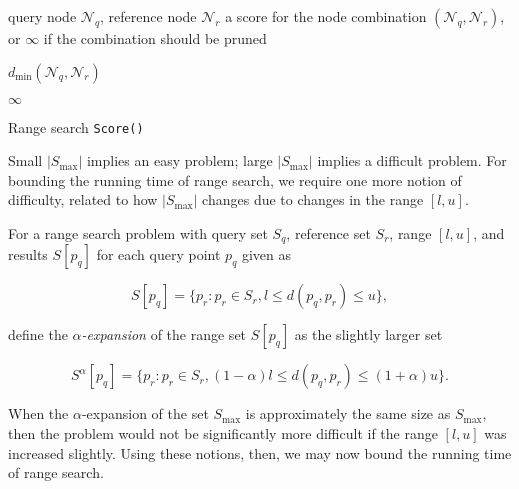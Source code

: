 \begin{algorithm}[tb]
  \begin{algorithmic}[1]
     query node $\mathscr{N}_q$, reference node
$\mathscr{N}_r$
     a score for the node combination $(\mathscr{N}_q,
\mathscr{N}_r)$, or $\infty$ if the combination should be pruned

    \medskip

      \RETURN $d_{\min}(\mathscr{N}_q, \mathscr{N}_r)$
    \ENDIF

    \RETURN $\infty$
  \end{algorithmic}
  \caption{Range search \texttt{Score()}}
  \label{alg:rs_sc}
\end{algorithm}

Small $| S_{\max} |$ implies an easy problem; large $| S_{\max} |$ implies a
difficult problem.  For bounding the running time of range search, we require
one more notion of difficulty, related to how $| S_{\max} |$ changes due to
changes in the range $[l, u]$.

\begin{defn}
For a range search problem with query set $S_q$, reference set $S_r$, range $[l,
u]$, and results $S[p_q]$ for each query point $p_q$ given as

\begin{equation}
S[p_q] = \{ p_r : p_r \in S_r, l \le d(p_q, p_r) \le u \},
\end{equation}

\noindent define the {\it $\alpha$-expansion} of the range set $S[p_q]$ as the slightly larger set

\begin{equation}
S^{\alpha}[p_q] = \{ p_r : p_r \in S_r, (1 - \alpha) l \le d(p_q, p_r) \le (1 +
\alpha) u \}.
\end{equation}
\end{defn}

When the $\alpha$-expansion of the set $S_{\max}$ is approximately the same size
as $S_{\max}$, then the problem would not be significantly more difficult if the
range $[l, u]$ was increased slightly.  Using these notions, then, we may now
bound the running time of range search.

